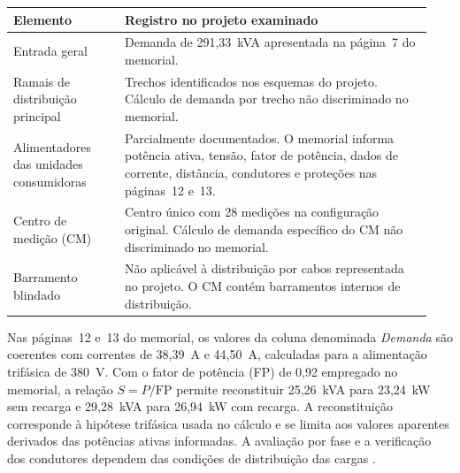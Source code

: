\par\noindent
\begin{minipage}{\linewidth}
  \label{qua:discriminacao-demanda}
  \vspace{0.7\baselineskip}
  \centering
  {\small
  \renewcommand{\arraystretch}{1.2}
  \begin{tabular}{|>{\raggedright\arraybackslash}p{0.25\linewidth}|>{\raggedright\arraybackslash}p{0.69\linewidth}|}
    \hline
    \textbf{Elemento} & \textbf{Registro no projeto examinado} \\\hline
    Entrada geral & Demanda de 291,33~kVA apresentada na página~7 do memorial. \\\hline
    Ramais de distribuição principal & Trechos identificados nos esquemas do projeto. Cálculo de demanda por trecho não discriminado no memorial. \\\hline
    Alimentadores das unidades consumidoras & Parcialmente documentados. O memorial informa potência ativa, tensão, fator de potência, dados de corrente, distância, condutores e proteções nas páginas~12 e~13. \\\hline
    Centro de medição (CM) & Centro único com 28 medições na configuração original. Cálculo de demanda específico do CM não discriminado no memorial. \\\hline
    Barramento blindado & Não aplicável à distribuição por cabos representada no projeto. O CM contém barramentos internos de distribuição. \\\hline
  \end{tabular}
  }
\end{minipage}
\par

Nas páginas~12 e~13 do memorial, os valores da coluna denominada \emph{Demanda} são coerentes com correntes de 38,39~A e 44,50~A, calculadas para a alimentação trifásica de 380~V. Com o fator de potência (FP) de 0,92 empregado no memorial, a relação \(S=P/\mathrm{FP}\) permite reconstituir 25,26~kVA para 23,24~kW sem recarga e 29,28~kVA para 26,94~kW com recarga. A reconstituição corresponde à hipótese trifásica usada no cálculo e se limita aos valores aparentes derivados das potências ativas informadas. A avaliação por fase e a verificação dos condutores dependem das condições de distribuição das cargas \cite[p.~12--13]{palatiummemorial2025}.

